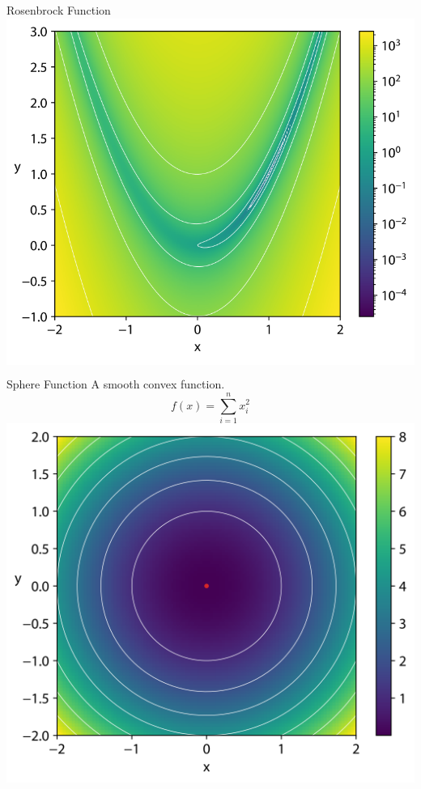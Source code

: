     \begin{frame}{Rosenbrock Function}
    \centering
    \colorbox{white}{\includegraphics[height=0.7\textheight]{images/Rosenbrock.png}}
    \end{frame}

    \begin{frame}{Sphere Function}
        A smooth convex function.
        \begin{equation*}
            f(x) = \sum^n_{i=1} x^2_i
        \end{equation*}
        \centering
        \includegraphics[height=0.6\textheight]{images/Sphere.png}
    \end{frame}

